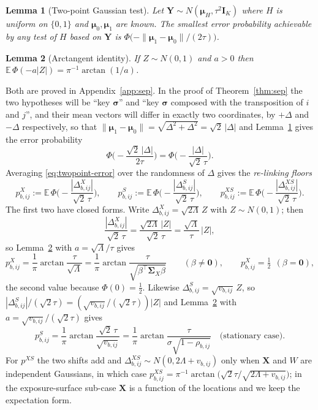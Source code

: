 \documentclass[11pt]{article}
\newtheorem{lemma}{Lemma}
\theoremstyle{definition}
\newcommand{\bX}{\mathbf{X}}
\newcommand{\bY}{\mathbf{Y}}
\newcommand{\bI}{\mathbf{I}}
\newcommand{\bzero}{\mathbf{0}}
\newcommand{\bSig}{\boldsymbol{\Sigma}}
\newcommand{\bmu}{\boldsymbol{\mu}}
\newcommand{\bsigma}{\boldsymbol{\sigma}}
\newcommand{\E}{\mathbb{E}}
\begin{document}
\begin{lemma}[Two-point Gaussian test]\label{lem:twopoint}
Let $\bY\sim N(\bmu_H,\tau^2\bI_K)$ where $H$ is uniform on $\{0,1\}$ and $\bmu_0,\bmu_1$ are known. The smallest error probability achievable by any test of $H$ based on $\bY$ is $\Phi\big(-\|\bmu_1-\bmu_0\|/(2\tau)\big)$.
\end{lemma}

\begin{lemma}[Arctangent identity]\label{lem:arctan}
If $Z\sim N(0,1)$ and $a>0$ then $\E\,\Phi(-a|Z|)=\pi^{-1}\arctan(1/a)$.
\end{lemma}

Both are proved in Appendix~\ref{app:sep}. In the proof of Theorem~\ref{thm:sep} the two hypotheses will be ``key $\bsigma$'' and ``key $\bsigma$ composed with the transposition of $i$ and $j$'', and their mean vectors will differ in exactly two coordinates, by $+\Delta$ and $-\Delta$ respectively, so that $\|\bmu_1-\bmu_0\|=\sqrt{\Delta^2+\Delta^2}=\sqrt2\,|\Delta|$ and Lemma~\ref{lem:twopoint} gives the error probability
\begin{equation}\label{eq:twopoint-error}
\Phi\Big(-\frac{\sqrt2\,|\Delta|}{2\tau}\Big)=\Phi\Big(-\frac{|\Delta|}{\sqrt2\,\tau}\Big).
\end{equation}
Averaging \eqref{eq:twopoint-error} over the randomness of $\Delta$ gives the \emph{re-linking floors}
\begin{equation}\label{eq:floors}
p^X_{b,ij}:=\E\,\Phi\Big(\!-\frac{|\Delta^X_{b,ij}|}{\sqrt2\,\tau}\Big),\qquad
p^S_{b,ij}:=\E\,\Phi\Big(\!-\frac{|\Delta^S_{b,ij}|}{\sqrt2\,\tau}\Big),\qquad
p^{XS}_{b,ij}:=\E\,\Phi\Big(\!-\frac{|\Delta^{XS}_{b,ij}|}{\sqrt2\,\tau}\Big).
\end{equation}
The first two have closed forms. Write $\Delta^X_{b,ij}=\sqrt{2\Lambda}\,Z$ with $Z\sim N(0,1)$; then
\[
\frac{|\Delta^X_{b,ij}|}{\sqrt2\,\tau}=\frac{\sqrt{2\Lambda}\,|Z|}{\sqrt2\,\tau}=\frac{\sqrt\Lambda}{\tau}\,|Z|,
\]
so Lemma~\ref{lem:arctan} with $a=\sqrt\Lambda/\tau$ gives
\begin{equation}\label{eq:pX}
p^X_{b,ij}=\frac1\pi\arctan\frac{\tau}{\sqrt\Lambda}=\frac1\pi\arctan\frac{\tau}{\sqrt{\beta^\top\bSig_X\beta}}\qquad(\beta\ne\bzero),\qquad p^X_{b,ij}=\tfrac12\ \ (\beta=\bzero),
\end{equation}
the second value because $\Phi(0)=\frac12$. Likewise $\Delta^S_{b,ij}=\sqrt{v_{b,ij}}\,Z$, so $|\Delta^S_{b,ij}|/(\sqrt2\tau)=(\sqrt{v_{b,ij}}/(\sqrt2\tau))|Z|$ and Lemma~\ref{lem:arctan} with $a=\sqrt{v_{b,ij}}/(\sqrt2\tau)$ gives
\begin{equation}\label{eq:pS}
p^S_{b,ij}=\frac1\pi\arctan\frac{\sqrt2\,\tau}{\sqrt{v_{b,ij}}}=\frac1\pi\arctan\frac{\tau}{\sigma\sqrt{1-\rho_{b,ij}}}\quad\text{(stationary case)}.
\end{equation}
For $p^{XS}$ the two shifts add and $\Delta^{XS}_{b,ij}\sim N(0,2\Lambda+v_{b,ij})$ only when $\bX$ and $W$ are independent Gaussians, in which case $p^{XS}_{b,ij}=\pi^{-1}\arctan\big(\sqrt2\tau/\sqrt{2\Lambda+v_{b,ij}}\big)$; in the exposure-surface sub-case $\bX$ is a function of the locations and we keep the expectation form.
\end{document}
